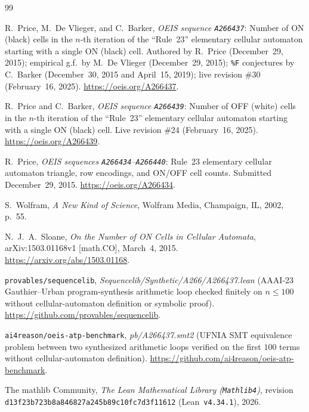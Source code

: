 \documentclass[11pt]{article}
\theoremstyle{definition}
\newcommand{\seq}[1]{\texttt{#1}}
\begin{document}
\begin{thebibliography}{99}
\raggedright

R.\ Price, M.\ De Vlieger, and C.\ Barker, \emph{OEIS sequence \seq{A266437}}: Number of ON (black) cells in the $n$-th iteration of the ``Rule~23'' elementary cellular automaton starting with a single ON (black) cell. Authored by R.\ Price (December~29, 2015); empirical g.f.\ by M.\ De Vlieger (December~29, 2015); \texttt{\%F} conjectures by C.\ Barker (December~30, 2015 and April~15, 2019); live revision \#30 (February~16, 2025). \url{https://oeis.org/A266437}.

R.\ Price and C.\ Barker, \emph{OEIS sequence \seq{A266439}}: Number of OFF (white) cells in the $n$-th iteration of the ``Rule~23'' elementary cellular automaton starting with a single ON (black) cell. Live revision \#24 (February~16, 2025). \url{https://oeis.org/A266439}.

R.\ Price, \emph{OEIS sequences \seq{A266434}--\seq{A266440}}: Rule~23 elementary cellular automaton triangle, row encodings, and ON/OFF cell counts. Submitted December~29, 2015. \url{https://oeis.org/A266434}.

S.\ Wolfram, \emph{A New Kind of Science}, Wolfram Media, Champaign, IL, 2002, p.~55.

N.~J.~A.\ Sloane, \emph{On the Number of ON Cells in Cellular Automata}, arXiv:1503.01168v1 [math.CO], March~4, 2015. \url{https://arxiv.org/abs/1503.01168}.

\texttt{provables/sequencelib}, \emph{Sequencelib/Synthetic/A266/A266437.lean} (AAAI-23 Gauthier--Urban program-synthesis arithmetic loop checked finitely on $n \le 100$ without cellular-automaton definition or symbolic proof). \url{https://github.com/provables/sequencelib}.

\texttt{ai4reason/oeis-atp-benchmark}, \emph{pb/A266437.smt2} (UFNIA SMT equivalence problem between two synthesized arithmetic loops verified on the first $100$ terms without cellular-automaton definition). \url{https://github.com/ai4reason/oeis-atp-benchmark}.

The mathlib Community, \emph{The Lean Mathematical Library (\texttt{Mathlib4})}, revision \texttt{d13f23b723b8a846827a245b89c10fc7d3f11612} (Lean~\texttt{v4.34.1}), 2026.

\end{thebibliography}
\end{document}

